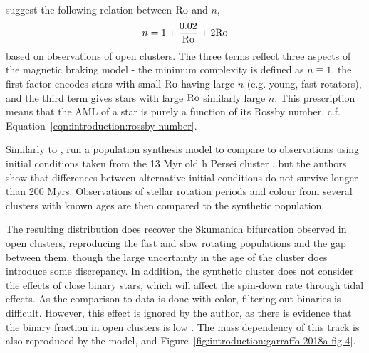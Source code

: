\citet{garraffo2018a} suggest the following relation between $\rm Ro$ and $n$,
\begin{equation}
    \label{eqn:introduction:garraffo field complexity}
    n = 1 + \frac{0.02}{\rm Ro} + 2 {\rm Ro}
\end{equation}
based on observations of open clusters. The three terms reflect three aspects of the magnetic braking model - the minimum complexity is defined as $n \equiv 1$, the first factor encodes stars with small $\rm Ro$ having large $n$ (e.g. young, fast rotators), and the third term gives stars with large $\rm Ro$ similarly large $n$. 
This prescription means that the AML of a star is purely a function of its Rossby number, c.f. Equation~\ref{eqn:introduction:rossby number}.

Similarly to \citet{matt2015}, \citet{garraffo2018a} run a population synthesis model to compare to observations using initial conditions taken from the 13 Myr old h Persei cluster \citep{moraux2013}, but the authors show that differences between alternative initial conditions do not survive longer than 200 Myrs. Observations of stellar rotation periods and colour from several clusters with known ages are then compared to the synthetic population.

The resulting distribution does recover the Skumanich bifurcation observed in open clusters, reproducing the fast and slow rotating populations and the gap between them, though the large uncertainty in the age of the cluster does introduce some discrepancy. 
In addition, the synthetic cluster does not consider the effects of close binary stars, which will affect the spin-down rate through tidal effects. As the comparison to data is done with color, filtering out binaries is difficult. However, this effect is ignored by the author, as there is evidence that the binary fraction in open clusters is low \citep{meibom2007}.
The mass dependency of this track is also reproduced by the model, and Figure~\ref{fig:introduction:garraffo 2018a fig 4}.

